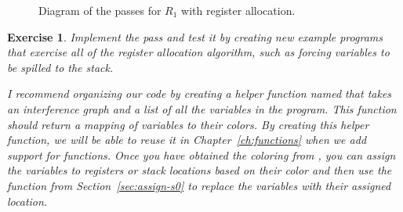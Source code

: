 \documentclass[11pt]{book}
\newtheorem{exercise}[theorem]{Exercise}
\begin{document}
\begin{figure}[p]
\caption{Diagram of the passes for $R_1$ with register allocation.}
\label{fig:reg-alloc-passes}
\end{figure}

\begin{exercise}\normalfont
Implement the pass  and test it by creating
new example programs that exercise all of the register allocation
algorithm, such as forcing variables to be spilled to the stack.

I recommend organizing our code by creating a helper function named
 that takes an interference graph and a list of all
the variables in the program. This function should return a mapping of
variables to their colors. By creating this helper function, we will
be able to reuse it in Chapter~\ref{ch:functions} when we add support
for functions.  Once you have obtained the coloring from
, you can assign the variables to registers or stack
locations based on their color and then use the 
function from Section~\ref{sec:assign-s0} to replace the variables
with their assigned location.
\end{exercise}
\end{document}
